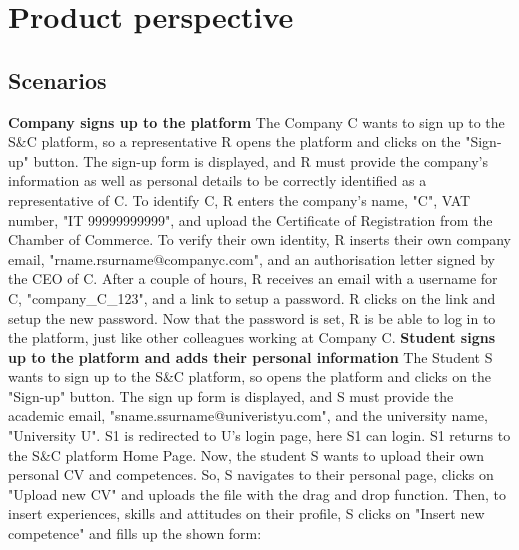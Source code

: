 \section{Product perspective}
\subsection{Scenarios}
\textbf{Company signs up to the platform}\newline
The Company C wants to sign up to the S\&C platform, so a representative R opens the platform and clicks on the "Sign-up" button. The sign-up form is displayed, and R must provide the company's information as well as personal details to be correctly identified as a representative of C. To identify C, R enters the company's name, "C", VAT number, "IT 99999999999", and upload the Certificate of Registration from the Chamber of Commerce. To verify their own identity, R inserts their own company email, "rname.rsurname@companyc.com", and an authorisation letter signed by the CEO of C. 
After a couple of hours, R receives an email with a username for C, "company\_C\_123", and a link to setup a password. R clicks on the link and setup the new password. Now that the password is set, R is be able to log in to the platform, just like other colleagues working at Company C.
\newline\newline
\textbf{Student signs up to the platform and adds their personal information}
\newline
The Student S wants to sign up to the S\&C platform, so opens the platform and clicks on the "Sign-up" button. The sign up form is displayed, and S must provide the academic email, "sname.ssurname@univeristyu.com", and the university name, "University U". S1 is redirected to U's login page, here S1 can login. S1 returns to the S\&C platform Home Page. Now, the student S wants to upload their own personal CV and competences. So, S navigates to their personal page, clicks on "Upload new CV" and uploads the file with the drag and drop function. Then, to insert experiences, skills and attitudes on their profile, S clicks on 
"Insert new competence" and fills up the shown form:
